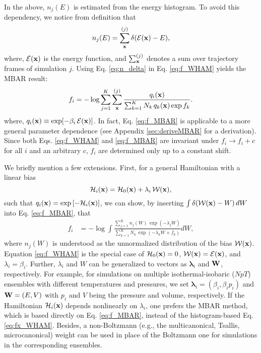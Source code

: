 \documentclass[reprint,aip,jcp,superscriptaddress]{revtex4-1}
\begin{document}
In the above,
$n_j(E)$ is estimated from the energy histogram.
%
To avoid this dependency,
we notice from definition that\cite{
souaille2001}
%
\begin{equation}
n_j(E)
=
\sum_{\mathbf{x}}^{(j)} \delta(\mathcal{E}(\mathbf{x}) - E),
\label{eq:n_delta}
\end{equation}
%
where,
$\mathcal{E}(\mathbf{x})$
is the energy function,
and
$\sum_{\mathbf{x}}^{(j)}$
denotes a sum over trajectory frames
of simulation $j$.
%
%
%
Using Eq. \eqref{eq:n_delta}
in Eq. \eqref{eq:f_WHAM} yields
the MBAR result\cite{
kumar1992, souaille2001, shirts2008}:
%
\begin{equation}
f_i
=
-\log
\sum_{j = 1}^K
\sum_{\mathbf{x}}^{(j)}
\frac{
  q_i(\mathbf{x})
}
{
  \sum_{k = 1}^K N_k \, q_k(\mathbf{x}) \exp f_k
}.
\label{eq:f_MBAR}
\end{equation}
%
where,
$q_i(\mathbf{x}) \equiv \exp[ -\beta_i \, \mathcal{E}(\mathbf{x}) ]$.
%
In fact, Eq. \eqref{eq:f_MBAR}
is applicable to a more general parameter dependence
(see Appendix \ref{sec:deriveMBAR}
for a derivation).
%
Since both Eqs. \eqref{eq:f_WHAM} and \eqref{eq:f_MBAR}
are invariant under $f_i \rightarrow f_i + c$
for all $i$ and an arbitrary $c$,
$f_i$ are determined only up to a constant shift.



We briefly mention a few extensions.
%
First,
for a general Hamiltonian
with a linear bias
\[
\mathcal{H}_i(\mathbf{x}) = \mathcal{H}_0(\mathbf{x}) + \lambda_i \, \mathcal{W}(\mathbf{x}),
\]
such that $q_i(\mathbf{x}) = \exp\left[ -\mathcal{H}_i(\mathbf{x}) \right]$,
%
we can show,
by inserting
$\int \delta(\mathcal{W}(\mathbf{x}) - W) \, dW$
into Eq. \eqref{eq:f_MBAR},
that
%
\begin{align}
f_i
&=
-\log
  \int
    \frac{
      \sum_{j = 1}^K n_j(W) \, \exp(-\lambda_j W)
    }
    {
      \sum_{k = 1}^K N_k \, \exp(-\lambda_k W + f_k)
    }
    d W,
\label{eq:fx_WHAM}
\end{align}
%
where
$n_j(W)$
is understood as
the unnormalized distribution of
the bias $\mathcal{W}(\mathbf{x})$.
%
Equation \eqref{eq:f_WHAM}
is the special case of
$\mathcal{H}_0(\mathbf{x}) = 0$,
$\mathcal{W}(\mathbf{x}) = \mathcal{E}(\mathbf{x})$,
and $\lambda_i = \beta_i$.
%
Further,
$\lambda_i$ and $W$
can be generalized
to vectors as
$\bm{\lambda}_i$
and
$\mathbf{W}$, respectively.
%
For example,
for simulations
on multiple isothermal-isobaric ($NpT$) ensembles
with different temperatures and pressures,
%
we set
$\bm{\lambda}_i = (\beta_i, \beta_i p_i)$
and
$\mathbf{W} = (E, V)$
with
$p_i$ and $V$
being the pressure and volume,
respectively.
%
If the Hamiltonian $\mathcal{H}_i(\mathbf{x})$
depends nonlinearly on $\lambda_i$,
one prefers the MBAR method\cite{
shirts2008},
which is based directly on
Eq. \eqref{eq:f_MBAR},
instead of the histogram-based Eq. \eqref{eq:fx_WHAM}.
%
Besides,
a non-Boltzmann
(e.g., the multicanonical\cite{
mezei1987, *berg1992, *lee1993},
Tsallis\cite{tsallis1988},
microcanonical\cite{
yan2003, *martin-mayor2007, *zhang2013})
weight
can be used in place of the Boltzmann one
for simulations in the corresponding ensembles.
%
\end{document}

